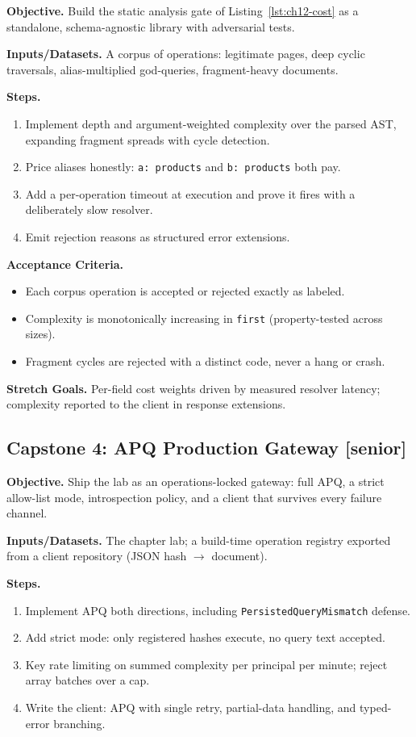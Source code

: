 \textbf{Objective.} Build the static analysis gate of
Listing~\ref{lst:ch12-cost} as a standalone, schema-agnostic library with
adversarial tests.

\textbf{Inputs/Datasets.} A corpus of operations: legitimate pages, deep
cyclic traversals, alias-multiplied god-queries, fragment-heavy
documents.

\textbf{Steps.}
\begin{enumerate}
  \item Implement depth and argument-weighted complexity over the parsed
        AST, expanding fragment spreads with cycle detection.
  \item Price aliases honestly: \texttt{a: products} and
        \texttt{b: products} both pay.
  \item Add a per-operation timeout at execution and prove it fires with
        a deliberately slow resolver.
  \item Emit rejection reasons as structured error extensions.
\end{enumerate}

\textbf{Acceptance Criteria.}
\begin{itemize}
  \item[$\square$] Each corpus operation is accepted or rejected
        exactly as labeled.
  \item[$\square$] Complexity is monotonically increasing in
        \texttt{first} (property-tested across sizes).
  \item[$\square$] Fragment cycles are rejected with a distinct code,
        never a hang or crash.
\end{itemize}

\textbf{Stretch Goals.} Per-field cost weights driven by measured
resolver latency; complexity reported to the client in response
extensions.

\subsection{Capstone 4: APQ Production Gateway [senior]}

\textbf{Objective.} Ship the lab as an operations-locked gateway: full
APQ, a strict allow-list mode, introspection policy, and a client that
survives every failure channel.

\textbf{Inputs/Datasets.} The chapter lab; a build-time operation
registry exported from a client repository (JSON hash $\to$ document).

\textbf{Steps.}
\begin{enumerate}
  \item Implement APQ both directions, including
        \texttt{PersistedQueryMismatch} defense.
  \item Add strict mode: only registered hashes execute, no query text
        accepted.
  \item Key rate limiting on summed complexity per principal per minute;
        reject array batches over a cap.
  \item Write the client: APQ with single retry, partial-data handling,
        and typed-error branching.
\end{enumerate}


